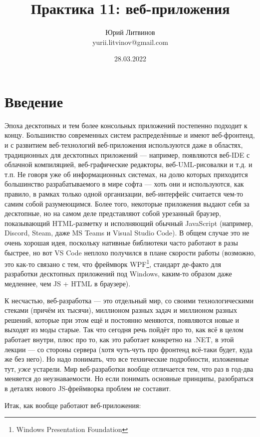 \documentclass[a5paper]{article}
\title{Практика 11: веб-приложения}
\author{Юрий Литвинов\\\small{yurii.litvinov@gmail.com}}
\date{28.03.2022}
\begin{document}
\maketitle
\thispagestyle{empty}

\section{Введение}

Эпоха десктопных и тем более консольных приложений постепенно подходит к концу. Большинство современных систем распределённые и имеют веб-фронтенд, и с развитием веб-технологий веб-приложения используются даже в областях, традиционных для десктопных приложений --- например, появляются веб-IDE с облачной компиляцией, веб-графические редакторы, веб-UML-рисовалки и т.д. и т.п. Не говоря уже об информационных системах, на долю которых приходится большинство разрабатываемого в мире софта --- хоть они и используются, как правило, в рамках только одной организации, веб-интерфейс считается чем-то самим собой разумеющимся. Более того, некоторые приложения выдают себя за десктопные, но на самом деле представляют собой урезанный браузер, показывающий HTML-разметку и исполняющий обычный JavaScript (например, Discord, Steam, даже MS Teams и Visual Studio Code). В общем случае это не очень хорошая идея, поскольку нативные библиотеки часто работают в разы быстрее, но вот VS Code неплохо получился в плане скорости работы (возможно, это как-то связано с тем, что фреймворк WPF\footnote{Windows Presentation Foundation}, стандарт де-факто для разработки десктопных приложений под Windows, каким-то образом даже медленнее, чем JS + HTML в браузере).

К несчастью, веб-разработка --- это отдельный мир, со своими технологическими стеками (причём их тысячи), миллионом разных задач и миллионом разных решений, которые при этом ещё и постоянно меняются, появляются новые и выходят из моды старые. Так что сегодня речь пойдёт про то, как всё в целом работает внутри, плюс про то, как это работает конкретно на .NET, в этой лекции --- со стороны сервера (хотя чуть-чуть про фронтенд всё-таки будет, куда же без него). Но надо понимать, что все технические подробности, изложенные тут, \emph{уже} устарели. Мир веб-разработки вообще отличается тем, что раз в год-два меняется до неузнаваемости. Но если понимать основные принципы, разобраться в деталях нового JS-фреймворка проблем не составит.

Итак, как вообще работают веб-приложения:
\end{document}
